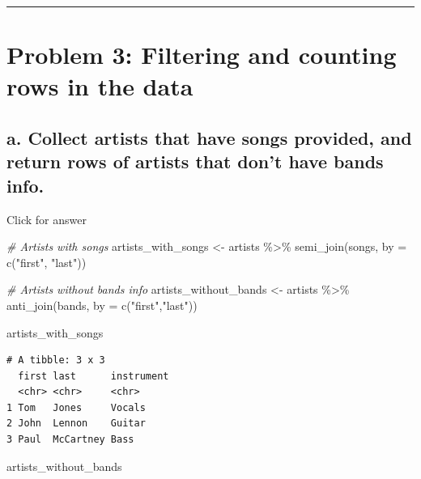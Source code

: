 \documentclass[
]{book}
\newenvironment{Shaded}{\begin{snugshade}}{\end{snugshade}}
\newcommand{\AttributeTok}[1]{\textcolor[rgb]{0.77,0.63,0.00}{#1}}
\newcommand{\CommentTok}[1]{\textcolor[rgb]{0.56,0.35,0.01}{\textit{#1}}}
\newcommand{\FunctionTok}[1]{\textcolor[rgb]{0.00,0.00,0.00}{#1}}
\newcommand{\NormalTok}[1]{#1}
\newcommand{\OtherTok}[1]{\textcolor[rgb]{0.56,0.35,0.01}{#1}}
\newcommand{\SpecialCharTok}[1]{\textcolor[rgb]{0.00,0.00,0.00}{#1}}
\newcommand{\StringTok}[1]{\textcolor[rgb]{0.31,0.60,0.02}{#1}}
\begin{document}
\begin{center}\rule{0.5\linewidth}{0.5pt}\end{center}

\hypertarget{problem-3-filtering-and-counting-rows-in-the-data}{%
\section{Problem 3: Filtering and counting rows in the data}\label{problem-3-filtering-and-counting-rows-in-the-data}}

\hypertarget{a.-collect-artists-that-have-songs-provided-and-return-rows-of-artists-that-dont-have-bands-info.}{%
\subsection{a. Collect artists that have songs provided, and return rows of artists that don't have bands info.}\label{a.-collect-artists-that-have-songs-provided-and-return-rows-of-artists-that-dont-have-bands-info.}}

Click for answer

\begin{Shaded}
\begin{Highlighting}[]
\CommentTok{\# Artists with songs}
\NormalTok{artists\_with\_songs }\OtherTok{\textless{}{-}}\NormalTok{ artists }\SpecialCharTok{\%\textgreater{}\%} 
  \FunctionTok{semi\_join}\NormalTok{(songs, }\AttributeTok{by =} \FunctionTok{c}\NormalTok{(}\StringTok{"first"}\NormalTok{, }\StringTok{"last"}\NormalTok{))}

\CommentTok{\# Artists without bands info}
\NormalTok{artists\_without\_bands }\OtherTok{\textless{}{-}}\NormalTok{ artists }\SpecialCharTok{\%\textgreater{}\%} 
  \FunctionTok{anti\_join}\NormalTok{(bands, }\AttributeTok{by =} \FunctionTok{c}\NormalTok{(}\StringTok{"first"}\NormalTok{,}\StringTok{"last"}\NormalTok{))}

\NormalTok{artists\_with\_songs}
\end{Highlighting}
\end{Shaded}

\begin{verbatim}
# A tibble: 3 x 3
  first last      instrument
  <chr> <chr>     <chr>     
1 Tom   Jones     Vocals    
2 John  Lennon    Guitar    
3 Paul  McCartney Bass      
\end{verbatim}

\begin{Shaded}
\begin{Highlighting}[]
\NormalTok{artists\_without\_bands}
\end{Highlighting}
\end{Shaded}
\end{document}
